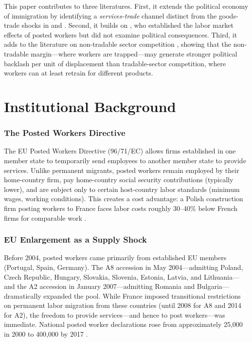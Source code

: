 \documentclass[12pt]{article}
\begin{document}
This paper contributes to three literatures. First, it extends the political economy of immigration \citep{dustmann2019immigration, halla2017immigration, steinmayr2021contact, edo2019immigration, tabellini2020gifts} by identifying a \emph{services-trade} channel distinct from the goods-trade shocks in \citet{colantone2018trade} and \citet{dippel2022china}. Second, it builds on \citet{munoz2024posted}, who established the labor market effects of posted workers but did not examine political consequences. Third, it adds to the literature on non-tradable sector competition \citep{burstein2020tradability, mian2014house}, showing that the non-tradable margin---where workers are trapped---may generate stronger political backlash per unit of displacement than tradable-sector competition, where workers can at least retrain for different products.

\section{Institutional Background}

\subsubsection*{The Posted Workers Directive} The EU Posted Workers Directive (96/71/EC) allows firms established in one member state to temporarily send employees to another member state to provide services. Unlike permanent migrants, posted workers remain employed by their home-country firm, pay home-country social security contributions (typically lower), and are subject only to certain host-country labor standards (minimum wages, working conditions). This creates a cost advantage: a Polish construction firm posting workers to France faces labor costs roughly 30--40\% below French firms for comparable work \citep{demaio2019posted, munoz2024posted}.

\subsubsection*{EU Enlargement as a Supply Shock} Before 2004, posted workers came primarily from established EU members (Portugal, Spain, Germany). The A8 accession in May 2004---admitting Poland, Czech Republic, Hungary, Slovakia, Slovenia, Estonia, Latvia, and Lithuania---and the A2 accession in January 2007---admitting Romania and Bulgaria---dramatically expanded the pool. While France imposed transitional restrictions on permanent labor migration from these countries (until 2008 for A8 and 2014 for A2), the freedom to provide services---and hence to post workers---was immediate. National posted worker declarations rose from approximately 25,000 in 2000 to 400,000 by 2017 \citep{dares2022}.
\end{document}
